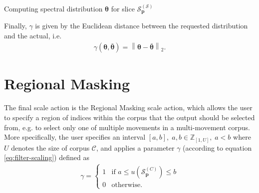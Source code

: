 \begin{algorithm}[h!]	
			\caption{Computing spectral distribution $\bm\theta$ for slice $\mathcal S^{(\mathcal S)}_{\bm p}$}
			\begin{spacing}{1.2}
			\begin{algorithmic}\label{alg:spectraldist}
				\ENDFOR
			\end{algorithmic}
			\end{spacing}
		\end{algorithm}
		
\noindent Finally, $\gamma$ is given by the Euclidean distance between the requested distribution and the actual, i.e.
	\begin{align}
		\gamma\left(\bm \theta, \bm{\bar \theta}\right) = \left\lVert \bm\theta - \bm{\bar \theta}\right\rVert_2.
	\end{align}


	


\section{Regional Masking}
The final scale action is the Regional Masking scale action, which allows the user to specify a region of indices within the corpus that the output should be selected from, e.g. to select only one of multiple movements in a multi-movement corpus. More specifically, the user specifies an interval $[a, b],\; a,b \in \mathbb Z_{[1,U]},\; a < b$ where $U$ denotes the size of corpus $\mathcal C$, and applies a parameter $\gamma$ (according to equation \ref{eq:filter-scaling}) defined as
	\begin{align}
		\gamma = \left\lbrace\begin{array}{ll}
			1 & \text{if } a \le u\left(\mathcal S^{(C)}_{\bm p}\right) \le b \\
			0 & \text{otherwise}.
		\end{array}\right.
	\end{align}

